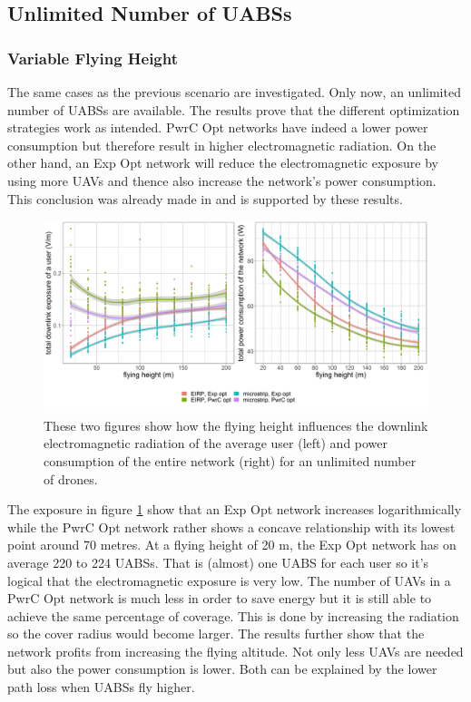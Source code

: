 \documentclass[twocolumn]{phdsymp} %
\begin{document}
\subsection{Unlimited Number of UABSs}
\subsubsection{Variable Flying Height}
The same cases as the previous scenario are investigated. Only now, an unlimited number of \gls{UABS}s are available.
The results prove that the different optimization strategies work as intended.
\gls{PwrC Opt} networks have indeed a lower power consumption but therefore result in higher electromagnetic radiation.
On the other hand, an \gls{Exp Opt} network will reduce the electromagnetic exposure by using more \gls{UAV}s and thence also increase the network's
power consumption.
This conclusion was already made in \cite{J1} and is supported by these results.
\begin{figure}[h!]
  \includegraphics[width=\linewidth]{../results/s3/fhvsdlAndPc.png}
  \caption{These two figures show how the flying height influences the downlink electromagnetic radiation of the average user (left) and 
  power consumption of the entire network (right) for an unlimited number of drones.}
  \label{fig:s3a_dlAndPc}
\end{figure}

The exposure in figure \ref{fig:s3a_dlAndPc} show that an \gls{Exp Opt} network increases logarithmically while the \gls{PwrC Opt} network rather 
shows a concave relationship with its lowest point around 70 metres.
At a flying height of 20 m, the \gls{Exp Opt} network has on average 220 to 224 \gls{UABS}s. That is (almost) one \gls{UABS} for each user
so it's logical that the electromagnetic exposure is very low.
The number of \gls{UAV}s in a \gls{PwrC Opt} network is much less in order 
to save energy but it is still able to achieve the same percentage of coverage.
This is done by increasing the radiation so the cover radius would become larger.
The results further show that the network profits from increasing the flying altitude. Not only
less \gls{UAV}s are needed but also the power consumption is lower. Both can be explained by the
lower path loss when UABSs fly higher. 
\end{document}
